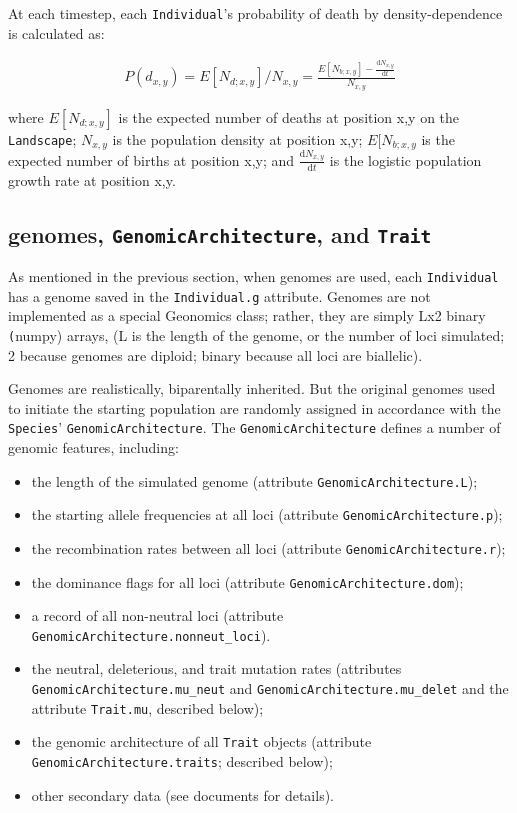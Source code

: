 ﻿\documentclass{article}
\begin{document}
At each timestep, each \texttt{Individual}'s probability of death by density-dependence
is calculated as:

\begin{equation}
\begin{split}
       P(d_{x,y}) = E[N_{d;x,y}]/N_{x,y} = \frac{E[N_{b;x,y}] - \frac{\mathrm{d}N_{x,y}}{\mathrm{d}t}}{N_{x,y}}
\end{split}
\end{equation}

where $E[N_{d;x,y}]$ is the expected number of deaths at position x,y on the
\texttt{Landscape}; $N_{x,y}$ is the population density at position x,y;
$E[N_{b;x,y}$ is the expected number of births at position x,y;
and $\frac{\mathrm{d}N_{x,y}}{\mathrm{d}t}$ is the
logistic population growth rate at position x,y.


\subsection{genomes, \texttt{GenomicArchitecture}, and \texttt{Trait}}
As mentioned in the previous section, when genomes are used, each \texttt{Individual} has
a genome saved in the \texttt{Individual.g} attribute. Genomes are not implemented
as a special Geonomics class; rather, they are simply Lx2 binary \texttt(numpy) arrays,
(L is the length of the genome, or the number of loci simulated; 2 because genomes
are diploid; binary because all loci are biallelic).

Genomes are realistically, biparentally inherited. But the original genomes used to
initiate the starting population are randomly assigned in accordance with the
\texttt{Species}' \texttt{GenomicArchitecture}. The \texttt{GenomicArchitecture} defines
a number of genomic features, including:
\begin{itemize}
        \item the length of the simulated genome (attribute \texttt{GenomicArchitecture.L});
        \item the starting allele frequencies at all loci (attribute \texttt{GenomicArchitecture.p});
        \item the recombination rates between all loci (attribute \texttt{GenomicArchitecture.r});
        \item the dominance flags for all loci (attribute \texttt{GenomicArchitecture.dom});
        \item a record of all non-neutral loci (attribute \texttt{GenomicArchitecture.nonneut\_loci}).
        \item the neutral, deleterious, and trait mutation rates (attributes \texttt{GenomicArchitecture.mu\_neut} and \texttt{GenomicArchitecture.mu\_delet} and the attribute \texttt{Trait.mu}, described below);
        \item the genomic architecture of all \texttt{Trait} objects (attribute \texttt{GenomicArchitecture.traits}; described below);
        \item other secondary data (see documents for details).
\end{itemize}
\end{document}

